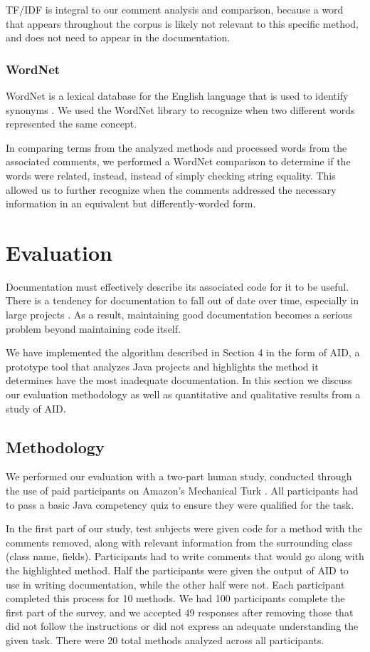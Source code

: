 \documentclass[preprint]{sigplanconf}
\begin{document}
TF/IDF is integral to our comment analysis and comparison, because a word that appears throughout the corpus is likely not relevant to this specific method, and does not need to appear in the documentation.

\subsubsection{WordNet}
WordNet is a lexical database for the English language that is used to identify synonyms \cite{wordnet}. We used the WordNet library to recognize when two different words represented the same concept.

In comparing terms from the analyzed methods and processed words from the associated comments, we performed a WordNet comparison to determine if the words were related, instead, instead of simply checking string equality. This allowed us to further recognize when the comments addressed the necessary information in an equivalent but differently-worded form.

\section{Evaluation}
Documentation must effectively describe its associated code for it to be useful. There is a tendency for documentation to fall out of date over time, especially in large projects \cite{forward}. As a result, maintaining good documentation becomes a serious problem beyond maintaining code itself.

We have implemented the algorithm described in Section 4 in the form of AID, a prototype tool that analyzes Java projects and highlights the method it determines have the most inadequate documentation. In this section we discuss our evaluation methodology as well as quantitative and qualitative results from a study of AID.

\subsection{Methodology}
We performed our evaluation with a two-part human study, conducted through the use of paid participants on Amazon's Mechanical Turk \cite{mturk}. All participants had to pass a basic Java competency quiz to ensure they were qualified for the task.

In the first part of our study, test subjects were given code for a method with the comments removed, along with relevant information from the surrounding class (class name, fields). Participants had to write comments that would go along with the highlighted method. Half the participants were given the output of AID to use in writing documentation, while the other half were not. Each participant completed this process for 10 methods. We had 100 participants complete the first part of the  survey, and we accepted 49 responses after removing those that did not follow the instructions or did not express an adequate understanding the given task. There were 20 total methods analyzed across all participants.
\end{document}
